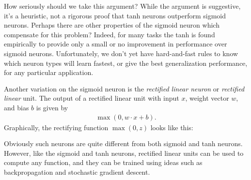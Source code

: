\documentclass[a4paper,twoside,10pt]{book}
\begin{document}
How seriously should we take this argument? While the argument is suggestive, it's a heuristic, not a rigorous proof that tanh neurons outperform sigmoid neurons. Perhaps there are other properties of the sigmoid neuron which compensate for this problem? Indeed, for many tasks the tanh is found empirically to provide only a small or no improvement in performance over sigmoid neurons. Unfortunately, we don't yet have hard-and-fast rules to know which neuron types will learn fastest, or give the best generalization performance, for any particular application.

Another variation on the sigmoid neuron is the \textit{rectified linear neuron} or \textit{rectified linear} unit. The output of a rectified linear unit with input $x$, weight vector $w$, and bias $b$ is given by
\begin{eqnarray}
\max(0, w \cdot x+b).
\label{eq:112}
\end{eqnarray}
Graphically, the rectifying function $\max(0,z)$ looks like this:
\begin{center} 
\end{center}
Obviously such neurons are quite different from both sigmoid and tanh neurons. However, like the sigmoid and tanh neurons, rectified linear units can be used to compute any function, and they can be trained using ideas such as backpropagation and stochastic gradient descent.
\end{document}
